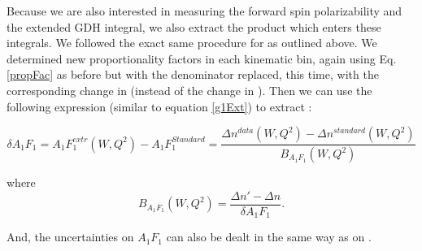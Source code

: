 Because we are also interested in measuring the forward spin polarizability and the extended GDH integral, we also extract the product \afones which enters these integrals. We followed the exact same procedure for \gones as outlined above. %
We determined new proportionality factors in each kinematic bin, again using Eq. \ref{propFac} as before but with the denominator replaced, this time, with the corresponding change in \afones (instead of the change in \gone). Then we can use the following expression (similar to equation \ref{g1Ext}) to extract \afonewq:

\begin{equation}
\label{a1f1Ext}
\delta A_{1}F_{1} = A_{1}F_{1}^{extr}(W,Q^2) - A_{1}F_{1}^{Standard} = \frac{\Delta n^{data}(W,Q^2) - \Delta n^{standard}(W,Q^2)}{B_{A_1F_1}(W,Q^2) }
\end{equation}

where
\begin{equation}
\label{propFac}
B_{A_1F_1}(W,Q^2)  = \frac{\Delta n' - \Delta n}{\delta A_1F_1}.
\end{equation}

And, the uncertainties on $A_1F_1$ can also be dealt in the same way as on \gone.








